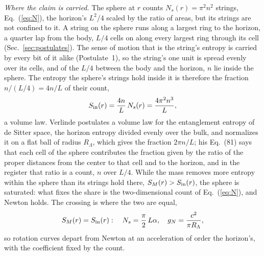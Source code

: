 \documentclass[aps,prd,twocolumn,superscriptaddress,nofootinbib,showkeys]{revtex4-2}
\newcommand{\RL}{R_\Lambda}
\begin{document}
\textit{Where the claim is carried.} The sphere at $r$ counts $N_s(r) = \pi^2n^2$ strings, Eq.~(\ref{eq:N}), the horizon's $L^2/4$ scaled by the ratio of areas, but its strings are not confined to it. A string on the sphere runs along a largest ring to the horizon, a quarter lap from the body, $L/4$ cells on along every largest ring through its cell (Sec.~\ref{sec:postulates}). The sense of motion that is the string's entropy is carried by every bit of it alike (Postulate~1), so the string's one unit is spread evenly over its cells, and of the $L/4$ between the body and the horizon, $n$ lie inside the sphere. The entropy the sphere's strings hold inside it is therefore the fraction $n/(L/4) = 4n/L$ of their count,
\begin{equation}
S_{\rm in}(r) = \frac{4n}{L}\,N_s(r) = \frac{4\pi^2 n^3}{L} ,
\label{eq:volume}
\end{equation}
a volume law. Verlinde postulates a volume law for the entanglement entropy of de Sitter space, the horizon entropy divided evenly over the bulk, and normalizes it on a flat ball of radius $\RL$, which gives the fraction $2\pi n/L$; his Eq.~(81) says that each cell of the sphere contributes the fraction given by the ratio of the proper distances from the center to that cell and to the horizon, and in the register that ratio is a count, $n$ over $L/4$. While the mass removes more entropy within the sphere than its strings hold there, $S_M(r) > S_{\rm in}(r)$, the sphere is saturated: what fixes the share is the two-dimensional count of Eq.~(\ref{eq:N}), and Newton holds. The crossing is where the two are equal,
\begin{equation}
S_M(r) = S_{\rm in}(r): \quad N_s = \frac{\pi}{2}\,L\alpha, \quad g_N = \frac{c^2}{\pi\RL} ,
\label{eq:criterion}
\end{equation}
so rotation curves depart from Newton at an acceleration of order the horizon's, with the coefficient fixed by the count.
\end{document}
